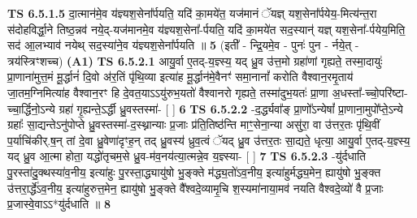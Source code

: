 \documentclass[17pt]{extarticle}
\begin{document}
                  \newline
                                \textbf{ TS 6.5.1.5} \newline
                  दा॒त्मान॑मे॒व य॑ज्ञ्यश॒सेना᳚र्पयति॒ यदि॑ का॒मये॑त॒ यज॑मानं ॅयज्ञ् यश॒सेना᳚र्पयेय॒-मित्य॑न्त॒रा स॑दोहविर्द्धा॒ने तिष्ठ॒न्नव॑ नये॒द्-यज॑मानमे॒व य॑ज्ञ्यश॒सेना᳚-र्पयति॒ यदि॑ का॒मये॑त सद॒स्यान्॑ यज्ञ् यश॒सेना᳚-र्पयेय॒मिति॒ सद॑ आ॒लभ्याव॑ नयेथ् सद॒स्या॑ने॒व य॑ज्ञ्यश॒सेना᳚र्पयति ॥ \textbf{  5} \newline
                  \newline
                      (इती᳚ - न्द्रि॒यमे॒व - पुनः॑ पुन - र्नये॒त् - त्रय॑स्त्रिꣳशच्च)  \textbf{(A1)} \newline \newline
                                        \textbf{ TS 6.5.2.1} \newline
                  आयु॒र्वा ए॒तद्-य॒ज्ञ्स्य॒ यद् ध्रु॒व उ॑त्त॒मो ग्रहा॑णां गृह्यते॒ तस्मा॒दायुः॑ प्रा॒णाना॑मुत्त॒मं मू॒र्द्धानं॑ दि॒वो अ॑र॒तिं पृ॑थि॒व्या इत्या॑ह मू॒र्द्धान॑मे॒वैनꣳ॑ समा॒नानां᳚ करोति वैश्वान॒रमृ॒ताय॑ जा॒तम॒ग्निमित्या॑ह वैश्वान॒रꣳ हि दे॒वत॒याऽऽयु॑रुभ॒यतो॑ वैश्वानरो गृह्यते॒ तस्मा॑दुभ॒यतः॑ प्रा॒णा अ॒धस्ता᳚-च्चो॒परि॑ष्टा-च्चा॒र्द्धिनो॒ऽन्ये ग्रहा॑ गृ॒ह्यन्ते॒ऽर्द्धी ध्रु॒वस्तस्मा॑- [  ] \textbf{  6} \newline
                  \newline
                                \textbf{ TS 6.5.2.2} \newline
                  -द॒र्द्ध्यवा᳚ङ् प्रा॒णो᳚ऽन्येषां᳚ प्रा॒णाना॒मुपो᳚प्ते॒ऽन्ये ग्रहाः᳚ सा॒द्यन्तेऽनु॑पोप्ते ध्रु॒वस्तस्मा॑-द॒स्थ्नान्याः प्र॒जाः प्र॑ति॒तिष्ठ॑न्ति माꣳ॒॒सेना॒न्या असु॑रा॒ वा उ॑त्तर॒तः पृ॑थि॒वीं प॒र्याचि॑कीर्.ष॒न् तां दे॒वा ध्रु॒वेणा॑दृꣳह॒न् तद् ध्रु॒वस्य॑ ध्रुव॒त्वं ॅयद् ध्रु॒व उ॑त्तर॒तः सा॒द्यते॒ धृत्या॒ आयु॒र्वा ए॒तद्-य॒ज्ञ्स्य॒ यद् ध्रु॒व आ॒त्मा होता॒ यद्धो॑तृचम॒से ध्रु॒व-म॑व॒नय॑त्या॒त्मन्ने॒व य॒ज्ञ्स्या- [  ] \textbf{  7} \newline
                  \newline
                                \textbf{ TS 6.5.2.3} \newline
                  -यु॑र्दधाति पु॒रस्ता॑दु॒क्थस्या॑व॒नीय॒ इत्या॑हुः पु॒रस्ता॒द्ध्यायु॑षो भु॒ङ्क्ते म॑द्ध्य॒तो॑ऽव॒नीय॒ इत्या॑हुर्मद्ध्य॒मेन॒ ह्यायु॑षो भु॒ङ्क्त उ॑त्तरा॒र्द्धे॑ऽव॒नीय॒ इत्या॑हुरुत्त॒मेन॒ ह्यायु॑षो भु॒ङ्क्ते वै᳚श्वदे॒व्यामृ॒चि श॒स्यमा॑नाया॒मव॑ नयति वैश्वदे॒व्यो॑ वै प्र॒जाः प्र॒जास्वे॒वाऽऽ*यु॑र्दधाति ॥ \textbf{  8} \newline
                  \newline
\end{document}
